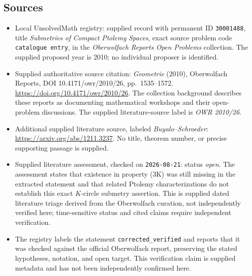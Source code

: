 \documentclass[11pt]{article}
\begin{document}
\subsection{Sources}
\begin{itemize}
\item Local UnsolvedMath registry: supplied record with permanent ID \texttt{30001488}, title \emph{Submetries of Compact Ptolemy Spaces}, exact source problem code \texttt{catalogue entry}, in the \emph{Oberwolfach Reports Open Problems} collection. The supplied proposed year is 2010; no individual proposer is identified.
\item Supplied authoritative source citation: \emph{Geometrie} (2010), Oberwolfach Reports, DOI 10.4171/owr/2010/26, pp.\ 1535--1572. \url{https://doi.org/10.4171/owr/2010/26}. The collection background describes these reports as documenting mathematical workshops and their open-problem discussions. The supplied literature-source label is \emph{OWR 2010/26}.
\item Additional supplied literature source, labeled \emph{Buyalo--Schroeder}: \url{https://arxiv.org/abs/1211.3237}. No title, theorem number, or precise supporting passage is supplied.
\item Supplied literature assessment, checked on \texttt{2026-08-21}: status \emph{open}. The assessment states that existence in property (3K) was still missing in the extracted statement and that related Ptolemy characterizations do not establish this exact $K$-circle submetry assertion. This is supplied dated literature triage derived from the Oberwolfach curation, not independently verified here; time-sensitive status and cited claims require independent verification.
\item The registry labels the statement \texttt{corrected\_verified} and reports that it was checked against the official Oberwolfach report, preserving the stated hypotheses, notation, and open target. This verification claim is supplied metadata and has not been independently confirmed here.
\end{itemize}
\end{document}
